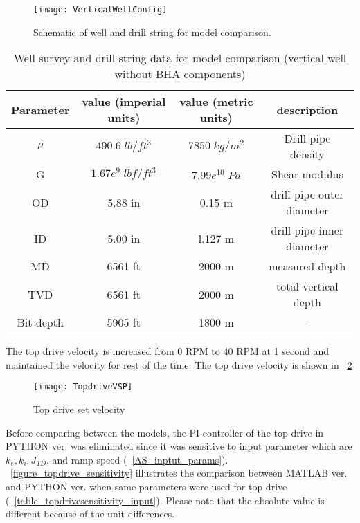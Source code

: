 \begin{figure}[!hbt]
  \centering
  \texttt{[image: VerticalWellConfig]}
  \caption[Schematic of well and drill string for model comparison.]{Schematic of well and drill string for model comparison.}\label{figure_verticalwell}
\end{figure}

\begin{table}[!hbt]
\centering
\begin{tabular}{|c|c|c|c|}
\hline
Parameter & value (imperial units) & value (metric units) & description\\                                                              
\hline
$\rho$ & $490.6\;lb/ft^3$ & $7850\;kg/m^2$ & Drill pipe density \\                                                  
\hline
G & $1.67e^9\;lbf/ft^3$ & $7.99e^{10}\;Pa$  & Shear modulus \\                                                  
\hline
OD & 5.88 in & 0.15 m & drill pipe outer diameter\\                                                       
\hline
ID & 5.00 in & l.127 m & drill pipe inner diameter  \\                                                      
\hline
MD & 6561 ft & 2000 m & measured depth\\                                                              
\hline
TVD & 6561 ft & 2000 m & total vertical depth\\
\hline
Bit depth & 5905 ft & 1800 m & - \\ 
\hline
\end{tabular}
\caption[Well survey data for model comparison (vertical well)]{Well survey and drill string data for model comparison (vertical well without BHA components)}\label{table_verticalwell_input}
\end{table}
The top drive velocity is increased from 0 RPM to 40 RPM at 1 second and maintained the velocity for rest of the time. The top drive velocity is shown in \figurename~\ref{figure_topdrive_VSP}

\begin{figure}[!hbt]
  \centering
  \texttt{[image: TopdriveVSP]}
  \caption[Top drive set velocity]{Top drive set velocity}\label{figure_topdrive_VSP}
\end{figure}


Before comparing between the models, the PI-controller of the top drive in PYTHON ver. was eliminated since it was sensitive to input parameter which are $k_e, k_i, J_{TD}$, and ramp speed (\tablename~\ref{AS_inptut_params}). \figurename~\ref{figure_topdrive_sensitivity} illustrates the comparison between MATLAB ver. and PYTHON ver. when same parameters were used for top drive (\tablename~\ref{table_topdrivesensitivity_input}). Please note that the absolute value is different because of the unit differences.

